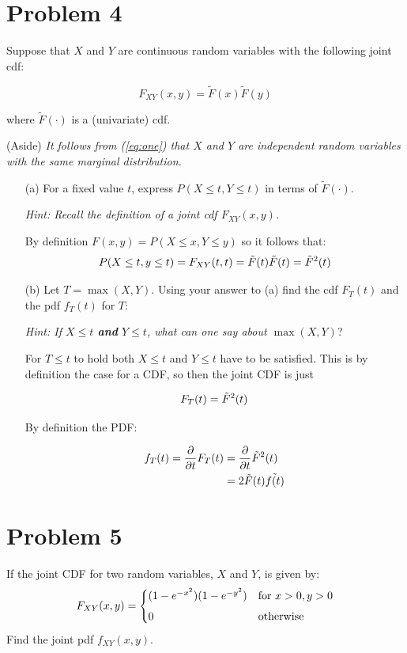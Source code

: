 \documentclass{article}
\newcommand{\1}{\mathbf{1}}
\begin{document}
\newpage
\section*{Problem 4} 
Suppose that $X$ and $Y$ are continuous random variables with the following joint cdf:

\begin{equation}\label{eq:one}
F_{XY}(x,y) = \widetilde{F}(x)\widetilde{F}(y)
\end{equation}

where $\widetilde{F}(\cdot)$ is a (univariate) cdf. 

{{(Aside)} \it It follows from {\rm (\ref{eq:one})} that $X$ and $Y$ are independent random variables with the same
marginal distribution.} 

\begin{itemize}
    \item[(a)] For a fixed value $t$, express $P(X \leq t, Y \leq t)$ in terms of $\widetilde{F}(\cdot)$.\par
    {\it Hint: Recall the definition of  a joint cdf $F_{XY}(x,y)$.}
    
    By definition $F(x,y)= P(X\leq x, Y\leq y)$ so it follows that:
    $$P(X \leq t, y\leq t) = F_{XY}(t,t) = \Tilde{F}(t)\Tilde{F}(t) = \Tilde{F}^2(t)$$
    
    \item[(b)] Let $T= \max (X,Y)$. Using your answer to (a) find the cdf $F_T(t)$ and the pdf $f_T(t)$ for $T$:\par
    {\it Hint: If $X\leq t$ {\bf and} $Y\leq t$, what can one say about $\max(X,Y)$}?
    
    For $T\leq t$ to hold both $X\leq t$ and $Y\leq t$ have to be satisfied. This is by definition the case for a CDF, so then the joint CDF is just
    
    $$ F_T(t) = \Tilde{F}^2(t)$$
    
    By definition the PDF:
    
    \begin{align*}
        f_T(t) = \frac{\partial}{\partial t} F_T(t) &=  \frac{\partial}{\partial t} \Tilde{F}^2(t) \\
        &= 2\Tilde{F}(t)\Tilde{f(t)}
    \end{align*}

\end{itemize}




\newpage
\section*{Problem 5}  If the joint CDF for two random variables, $X$ and $Y$, is  
given by:
$$
F_{XY}(x,y) = \begin{cases}
    (1-e^{-x^2})(1-e^{-y^2}) & \hbox{for } x>0, y>0\\[4pt]
    0 & \hbox{otherwise}
    \end{cases}
$$
Find the joint pdf $f_{XY}(x,y)$.
\end{document}

